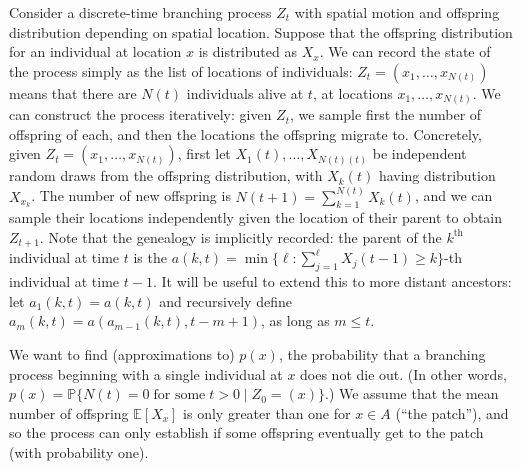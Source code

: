 \documentclass{article}
\renewcommand{\P}{\mathbb{P}}
\newcommand{\E}{\mathbb{E}}
\begin{document}
Consider a discrete-time branching process $Z_t$ with spatial motion and offspring distribution depending on spatial location.
Suppose that the offspring distribution for an individual at location $x$ is distributed as $X_x$.
We can record the state of the process simply as the list of locations of individuals:
$Z_t = (x_1, \ldots, x_{N(t)})$ means that there are $N(t)$ individuals alive at $t$, at locations $x_1, \ldots, x_{N(t)}$.
We can construct the process iteratively: given $Z_t$,
we sample first the number of offspring of each, and then the locations the offspring migrate to.
Concretely, given $Z_{t} = (x_1, \ldots, x_{N(t)})$,
first let $X_1(t),\ldots,X_{N(t)(t)}$ be independent random draws from the offspring distribution,
with $X_k(t)$ having distribution $X_{x_k}$.
The number of new offspring is $N(t+1) = \sum_{k=1}^{N(t)} X_k(t)$,
and we can sample their locations independently given the location of their parent to obtain $Z_{t+1}$.
Note that the genealogy is implicitly recorded:
the parent of the $k^\mathrm{th}$ individual at time $t$ is
the $a(k,t) = \min\{ \ell : \sum_{j=1}^\ell X_j(t-1) \ge k \}$-th individual at time $t-1$.
It will be useful to extend this to more distant ancestors:
let $a_1(k,t) = a(k,t)$ and recursively define $a_m(k,t) = a(a_{m-1}(k,t),t-m+1)$, as long as $m\le t$.

We want to find (approximations to) $p(x)$, the probability that a branching process beginning with a single individual at $x$ does not die out. 
(In other words, $p(x) = \P\{ N(t) = 0 \; \mbox{for some}\; t>0 \; \vert \; Z_0 = (x) \}$.)
We assume that the mean number of offspring $\E[X_x]$ is only greater than one for $x \in A$ (``the patch''),
and so the process can only establish if some offspring eventually get to the patch (with probability one).
\end{document}
